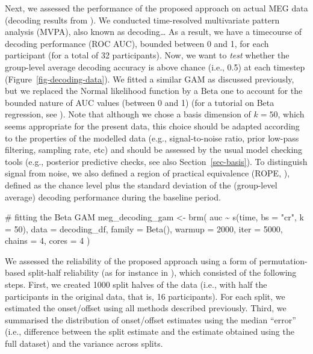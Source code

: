\documentclass[
  doc,
  floatsintext,
  longtable,
  a4paper,
  nolmodern,
  notxfonts,
  notimes,
  colorlinks=true,linkcolor=blue,citecolor=blue,urlcolor=blue]{apa7}
\newenvironment{Shaded}{\begin{snugshade}}{\end{snugshade}}
\newcommand{\AttributeTok}[1]{\textcolor[rgb]{0.40,0.45,0.13}{#1}}
\newcommand{\CommentTok}[1]{\textcolor[rgb]{0.37,0.37,0.37}{#1}}
\newcommand{\DecValTok}[1]{\textcolor[rgb]{0.68,0.00,0.00}{#1}}
\newcommand{\FunctionTok}[1]{\textcolor[rgb]{0.28,0.35,0.67}{#1}}
\newcommand{\NormalTok}[1]{\textcolor[rgb]{0.00,0.23,0.31}{#1}}
\newcommand{\OtherTok}[1]{\textcolor[rgb]{0.00,0.23,0.31}{#1}}
\newcommand{\SpecialCharTok}[1]{\textcolor[rgb]{0.37,0.37,0.37}{#1}}
\newcommand{\StringTok}[1]{\textcolor[rgb]{0.13,0.47,0.30}{#1}}
\begin{document}
Next, we assessed the performance of the proposed approach on actual MEG
data (decoding results from ). We conducted time-resolved multivariate
pattern analysis (MVPA), also known as decoding\ldots{} As a result, we
have a timecourse of decoding performance (ROC AUC), bounded between 0
and 1, for each participant (for a total of 32 participants). Now, we
want to \emph{test} whether the group-level average decoding accuracy is
above chance (i.e., 0.5) at each timestep
(Figure~\ref{fig-decoding-data}). We fitted a similar GAM as discussed
previously, but we replaced the \(\mathrm{Normal}\) likelihood function
by a \(\mathrm{Beta}\) one to account for the bounded nature of AUC
values (between 0 and 1) (for a tutorial on Beta regression, see
). Note that
although we chose a basis dimension of \(k=50\), which seems appropriate
for the present data, this choice should be adapted according to the
properties of the modelled data (e.g., signal-to-noise ratio, prior
low-pass filtering, sampling rate, etc) and should be assessed by the
usual model checking tools (e.g., posterior predictive checks, see also
Section~\ref{sec-basis}). To distinguish signal from noise, we also
defined a region of practical equivalence (ROPE,
), defined as the
chance level plus the standard deviation of the (group-level average)
decoding performance during the baseline period.

\begin{Shaded}
\begin{Highlighting}[]
\CommentTok{\# fitting the Beta GAM}
\NormalTok{meg\_decoding\_gam }\OtherTok{\textless{}{-}} \FunctionTok{brm}\NormalTok{(}
\NormalTok{    auc }\SpecialCharTok{\textasciitilde{}} \FunctionTok{s}\NormalTok{(time, }\AttributeTok{bs =} \StringTok{"cr"}\NormalTok{, }\AttributeTok{k =} \DecValTok{50}\NormalTok{),}
    \AttributeTok{data =}\NormalTok{ decoding\_df,}
    \AttributeTok{family =} \FunctionTok{Beta}\NormalTok{(),}
    \AttributeTok{warmup =} \DecValTok{2000}\NormalTok{,}
    \AttributeTok{iter =} \DecValTok{5000}\NormalTok{,}
    \AttributeTok{chains =} \DecValTok{4}\NormalTok{,}
    \AttributeTok{cores =} \DecValTok{4}
\NormalTok{    )}
\end{Highlighting}
\end{Shaded}

We assessed the reliability of the proposed approach using a form of
permutation-based split-half reliability (as for instance in
), which consisted
of the following steps. First, we created 1000 split halves of the data
(i.e., with half the participants in the original data, that is, 16
participants). For each split, we estimated the onset/offset using all
methods described previously. Third, we summarised the distribution of
onset/offset estimates using the median ``error'' (i.e., difference
between the split estimate and the estimate obtained using the full
dataset) and the variance across splits.
\end{document}
